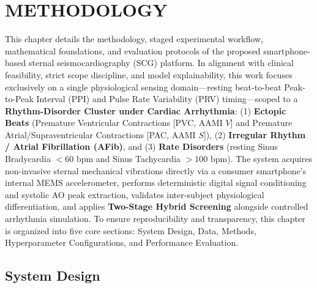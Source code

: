 \chapter{METHODOLOGY}

This chapter details the methodology, staged experimental workflow, mathematical foundations, and evaluation protocols of the proposed smartphone-based sternal seismocardiography (SCG) platform. In alignment with clinical feasibility, strict scope discipline, and model explainability, this work focuses exclusively on a single physiological sensing domain---resting beat-to-beat Peak-to-Peak Interval (PPI) and Pulse Rate Variability (PRV) timing---scoped to a \textbf{Rhythm-Disorder Cluster under Cardiac Arrhythmia}: (1) \textbf{Ectopic Beats} (Premature Ventricular Contractions [PVC, AAMI $V$] and Premature Atrial/Supraventricular Contractions [PAC, AAMI $S$]), (2) \textbf{Irregular Rhythm / Atrial Fibrillation (AFib)}, and (3) \textbf{Rate Disorders} (resting Sinus Bradycardia $< 60\text{ bpm}$ and Sinus Tachycardia $> 100\text{ bpm}$). The system acquires non-invasive sternal mechanical vibrations directly via a consumer smartphone's internal MEMS accelerometer, performs deterministic digital signal conditioning and systolic AO peak extraction, validates inter-subject physiological differentiation, and applies \textbf{Two-Stage Hybrid Screening} alongside controlled arrhythmia simulation. To ensure reproducibility and transparency, this chapter is organized into five core sections: System Design, Data, Methods, Hyperparameter Configurations, and Performance Evaluation.

\section{System Design}

